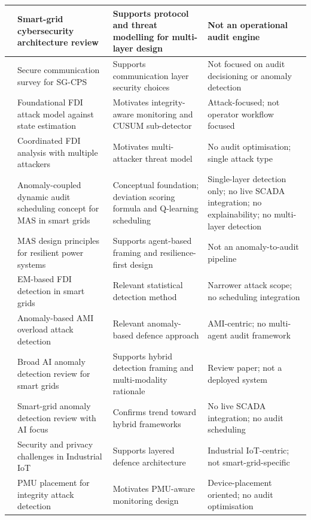 \begin{longtable}{|p{0.6cm}|p{3.8cm}|p{4.0cm}|p{4.5cm}|}
\cite{achaal2024study} & Smart-grid cybersecurity architecture review & Supports protocol and threat modelling for multi-layer design & Not an operational audit engine \\
\hline
\cite{sharma2024survey} & Secure communication survey for SG-CPS & Supports communication layer security choices & Not focused on audit decisioning or anomaly detection \\
\hline
\cite{liu2009false} & Foundational FDI attack model against state estimation & Motivates integrity-aware monitoring and CUSUM sub-detector & Attack-focused; not operator workflow focused \\
\hline
\cite{yan2020false} & Coordinated FDI analysis with multiple attackers & Motivates multi-attacker threat model & No audit optimisation; single attack type \\
\hline
\cite{priyadarsini2025enhancing} & Anomaly-coupled dynamic audit scheduling concept for MAS in smart grids & Conceptual foundation; deviation scoring formula and Q-learning scheduling & Single-layer detection only; no live SCADA integration; no explainability; no multi-layer detection \\
\hline
\cite{farid2014multi} & MAS design principles for resilient power systems & Supports agent-based framing and resilience-first design & Not an anomaly-to-audit pipeline \\
\hline
\cite{hu2023detection} & EM-based FDI detection in smart grids & Relevant statistical detection method & Narrower attack scope; no scheduling integration \\
\hline
\cite{korba2020anomaly} & Anomaly-based AMI overload attack detection & Relevant anomaly-based defence approach & AMI-centric; no multi-agent audit framework \\
\hline
\cite{sarker2026review} & Broad AI anomaly detection review for smart grids & Supports hybrid detection framing and multi-modality rationale & Review paper; not a deployed system \\
\hline
\cite{burgos2024review} & Smart-grid anomaly detection review with AI focus & Confirms trend toward hybrid frameworks & No live SCADA integration; no audit scheduling \\
\hline
\cite{sadeghi2015security} & Security and privacy challenges in Industrial IoT & Supports layered defence architecture & Industrial IoT-centric; not smart-grid-specific \\
\hline
\cite{giani2014phasor} & PMU placement for integrity attack detection & Motivates PMU-aware monitoring design & Device-placement oriented; no audit optimisation \\

\end{longtable}
